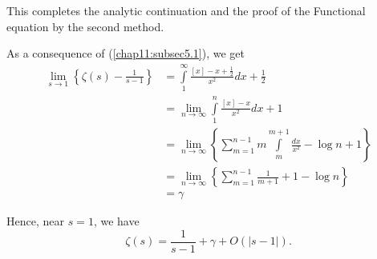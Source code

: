 This completes the analytic continuation and the proof of the
Functional equation by the second method.

As a consequence of (\ref{chap11:subsec5.1}), we get
\begin{align*}
\lim\limits_{s\to 1} \left\{\zeta (s) - \frac{1}{s-1} \right\} & =
\int\limits^\infty_1 \frac{[x]-x+\frac{1}{2}}{x^2} dx + \frac{1}{2}\\
& = \lim\limits_{n\to \infty} \int\limits^n_1 \frac{[x]-x}{x^2} dx
+1\\
& = \lim\limits_{n \to \infty} \left\{\sum\limits^{n-1}_{m=1} m
\int\limits^{m+1}_m \frac{dx}{x^2} - \log n +1 \right\}\\
& = \lim\limits_{n \to \infty} \left\{\sum\limits^{n-1}_{m=1}
\frac{1}{m+1} + 1 - \log n  \right\}\\
& = \gamma
\end{align*}\pageoriginale

Hence, near $s=1$, we have
$$
\zeta(s) = \frac{1}{s-1} + \gamma + O (|s-1|).
$$

